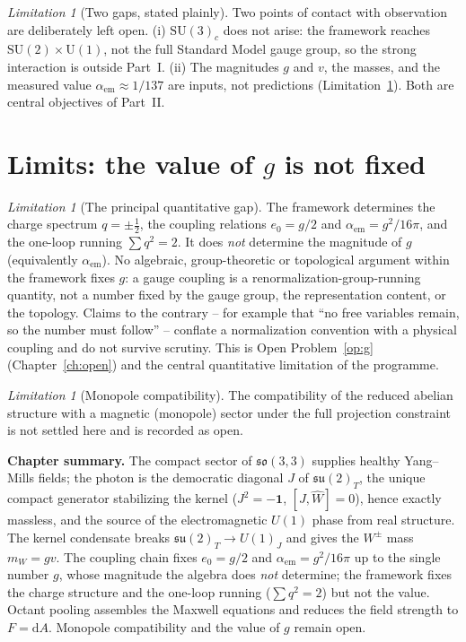 \documentclass[11pt,oneside]{book}
\newcommand{\Wh}{\hat{W}}                         %
\newcommand{\dd}{\mathrm{d}}
\newcommand{\su}{\mathfrak{su}}
\newcommand{\so}{\mathfrak{so}}
\theoremstyle{plain}
\theoremstyle{definition}
\theoremstyle{remark}
\newtheorem{limitation}[theorem]{Limitation}
\begin{document}
\begin{limitation}[Two gaps, stated plainly]
\label{lim:sm}
Two points of contact with observation are deliberately left open. (i)
$\mathrm{SU}(3)_c$ does not arise: the framework reaches
$\mathrm{SU}(2)\times\mathrm U(1)$, not the full Standard Model gauge group, so the
strong interaction is outside Part~I. (ii) The magnitudes $g$ and $v$, the masses,
and the measured value $\alpha_{\mathrm{em}}\approx1/137$ are inputs, not predictions
(Limitation~\ref{lim:g}). Both are central objectives of Part~II.
\end{limitation}

\section{Limits: the value of $g$ is not fixed}
\label{sec:gauge-limits}

\begin{limitation}[The principal quantitative gap]
\label{lim:g}
The framework determines the charge spectrum $q=\pm\tfrac12$, the coupling relations
$e_0=g/2$ and $\alpha_{\mathrm{em}}=g^2/16\pi$, and the one-loop running
$\sum q^2=2$. It does \emph{not} determine the magnitude of $g$ (equivalently
$\alpha_{\mathrm{em}}$). No algebraic, group-theoretic or topological argument
within the framework fixes $g$: a gauge coupling is a renormalization-group-running
quantity, not a number fixed by the gauge group, the representation content, or the
topology. Claims to the contrary -- for example that ``no free variables remain, so
the number must follow'' -- conflate a normalization convention with a physical
coupling and do not survive scrutiny. This is Open Problem~\ref{op:g}
(Chapter~\ref{ch:open}) and the central quantitative limitation of the programme.
\end{limitation}

\begin{limitation}[Monopole compatibility]
\label{lim:monopole}
The compatibility of the reduced abelian structure with a magnetic (monopole)
sector under the full projection constraint is not settled here and is recorded as
open.
\end{limitation}

\begin{leavesbox}
\textbf{Chapter summary.} The compact sector of $\so(3,3)$ supplies healthy
Yang--Mills fields; the photon is the democratic diagonal $J$ of $\su(2)_T$, the
unique compact generator stabilizing the kernel ($J^2=-\mathbf 1$, $[J,\Wh]=0$),
hence exactly massless, and the source of the electromagnetic $U(1)$ phase from
real structure. The kernel condensate breaks $\su(2)_T\to U(1)_J$ and gives the
$W^\pm$ mass $m_W=gv$. The coupling chain fixes $e_0=g/2$ and
$\alpha_{\mathrm{em}}=g^2/16\pi$ up to the single number $g$, whose magnitude the
algebra does \emph{not} determine; the framework fixes the charge structure and the
one-loop running ($\sum q^2=2$) but not the value. Octant pooling assembles the Maxwell
equations and reduces the field strength to $F=\dd A$. Monopole compatibility and
the value of $g$ remain open.
\end{leavesbox}
\end{document}

